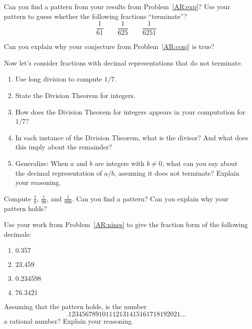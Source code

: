 \begin{prob}\label{AR:conj}
Can you find a pattern from your results from Problem~\ref{AR:exp}?
Use your pattern to guess whether the following fractions
``terminate''?  
\[
\dfrac{1}{61}\qquad \dfrac{1}{625} \qquad \dfrac{1}{6251}
\]
\end{prob}


\begin{prob}
Can you explain why your conjecture from Problem~\ref{AR:conj} is true?
\end{prob}

\begin{prob} Now let's consider fractions with decimal representations that do not terminate.  
\begin{enumerate}
\item Use long division to compute $1/7$.
\item {}
State the Division Theorem for integers.
\item How does the Division Theorem for integers appears in your computation for $1/7$?
\item In each instance of the Division Theorem, what 
is the divisor? And what does this imply about the remainder?
\item Generalize:  When $a$ and $b$ are integers with $b\ne 0$, 
what can you say about the decimal representation of $a/b$, assuming
it does not terminate?  Explain your reasoning.  
\end{enumerate}
\end{prob}

\begin{prob}\label{AR:nines} 
Compute $\frac{1}{9}$, $\frac{1}{99}$, and $\frac{1}{999}$. Can you
find a pattern? Can you explain why your pattern holds?
\end{prob}

\begin{prob}
Use your work from Problem~\ref{AR:nines} to give the fraction form of
the following decimals:
\begin{enumerate}
\item $0.\overline{357}$
\item $23.\overline{459}$
\item $0.23\overline{4598}$
\item $76.3\overline{421}$
\end{enumerate}
\end{prob}

\begin{prob} 
Assuming that the pattern holds, is the number
\[
.123456789101112131415161718192021\dots
\]
a rational number? Explain your reasoning.
\end{prob}
